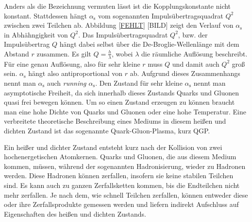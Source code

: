 Anders als die Bezeichnung vermuten l\"asst ist die Kopplungskonstante nicht konstant.
Stattdessen h\"angt $\alpha_\text{s}$ vom sogenannten Impulsübertragsquadrat $Q^{2}$ zwischen zwei Teilchen ab.
Abbildung \ref{FEHLT} [BILD] zeigt den Verlauf von $\alpha_\text{s}$ in Abh\"ahngigkeit von $Q^{2}$.
Das Impulsübertragsquadrat $Q^{2}$, bzw. der Impulsübertrag $Q$ h\"angt dabei selbst \"uber die De-Broglie-Wellenl\"ange mit dem Abstand $r$ zusammen.
Es gilt $Q = \frac{h}{\lambda}$, wobei $\lambda$ die r\"aumliche Aufl\"osung beschreibt.
F\"ur eine genau Aufl\"osung, also f\"ur  sehr kleine $r$ muss $Q$ und damit auch $Q^{2}$ gro{\ss} sein.
$\alpha_\text{s}$ h\"angt also antiproportional von $r$ ab.
Aufgrund dieses Zusammenhangs nennt man $\alpha_\text{s}$ auch \textit{running $\alpha_\text{s}$}. 
Den Zustand f\"ur sehr kleine $\alpha_\text{s}$ nennt man asymptotische Freiheit, da sich innerhalb dieses Zustands Quarks und Gluonen quasi frei bewegen k\"onnen.
Um so einen Zustand erzeugen zu k\"onnen braucht man eine hohe Dichte von Quarks und Gluonen oder eine hohe Temperatur.
Eine verbreitete theoretische Beschreibung eines Mediums in diesem hei{\ss}en und dichten Zustand ist das sogenannte Quark-Gluon-Plasma, kurz QGP.

Ein hei{\ss}er und dichter Zustand entsteht kurz nach der Kollision von zwei hochenergetischen Atomkernen.
Quarks und Gluonen, die aus diesem Medium kommen, m\"ussen, w\"ahrend der sogenannten Hadronisierung, wieder zu Hadronen werden.
Diese Hadronen k\"onnen zerfallen, insofern sie keine stabilen Teilchen sind.
Es kann auch zu ganzen Zerfallsketten kommen, bis die Endteilchen nicht mehr zerfallen.
Je nach dem, wie schnell Teilchen zerfallen, k\"onnen entweder diese oder ihre Zerfallsprodukte gemessen werden und liefern indirekt Aufschluss auf Eigenschaften des hei{\ss}en und dichten Zustands.